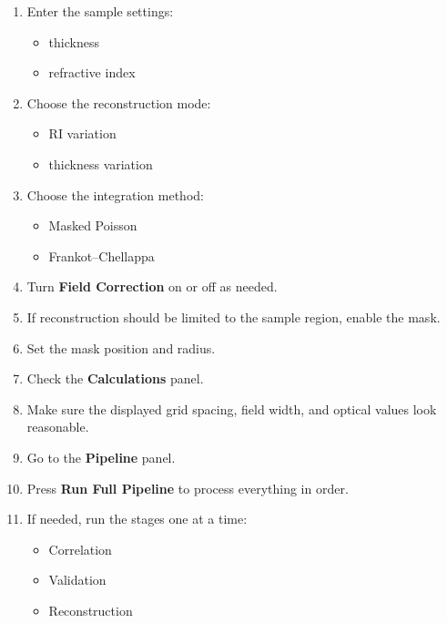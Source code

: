 \documentclass[11pt]{article}
\begin{document}
\begin{enumerate}
    \begin{itemize}
        \item sensor pixel pitch
        \item background-to-sample distance
        \item sample-to-lens distance
        \item lens focal length
        \item aperture diameter
    \end{itemize}
    \item Enter the sample settings:
    \begin{itemize}
        \item thickness
        \item refractive index
    \end{itemize}
    \item Choose the reconstruction mode:
    \begin{itemize}
        \item RI variation
        \item thickness variation
    \end{itemize}
    \item Choose the integration method:
    \begin{itemize}
        \item Masked Poisson
        \item Frankot--Chellappa
    \end{itemize}
    \item Turn \textbf{Field Correction} on or off as needed.
    \item If reconstruction should be limited to the sample region, enable the mask.
    \item Set the mask position and radius.
    \item Check the \textbf{Calculations} panel.
    \item Make sure the displayed grid spacing, field width, and optical values look reasonable.
    \item Go to the \textbf{Pipeline} panel.
    \item Press \textbf{Run Full Pipeline} to process everything in order.
    \item If needed, run the stages one at a time:
    \begin{itemize}
        \item Correlation
        \item Validation
        \item Reconstruction
    \end{itemize}

\end{enumerate}
\end{document}
